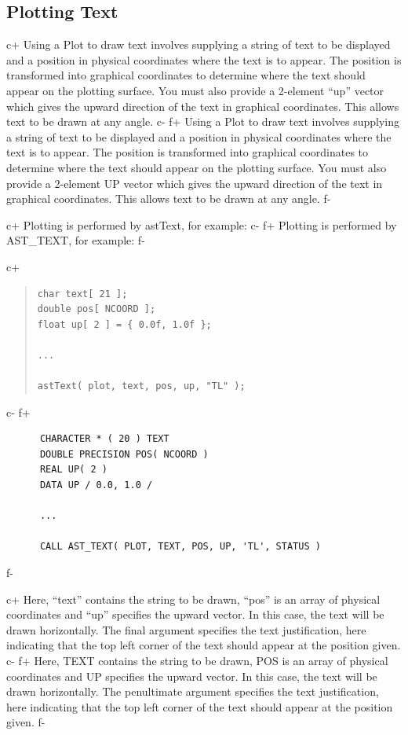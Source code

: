 \documentclass[twoside,11pt]{article}
\begin{document}
\subsection{Plotting Text}

c+
Using a Plot to draw text involves supplying a string of text to be
displayed and a position in physical coordinates where the text is to
appear. The position is transformed into graphical coordinates to
determine where the text should appear on the plotting surface. You
must also provide a 2-element ``up'' vector which gives the upward
direction of the text in graphical coordinates. This allows text to be
drawn at any angle.
c-
f+
Using a Plot to draw text involves supplying a string of text to be
displayed and a position in physical coordinates where the text is to
appear. The position is transformed into graphical coordinates to
determine where the text should appear on the plotting surface. You
must also provide a 2-element UP vector which gives the upward
direction of the text in graphical coordinates. This allows text to be
drawn at any angle.
f-

c+
Plotting is performed by astText, for example:
c-
f+
Plotting is performed by AST\_TEXT, for example:
f-

c+
\begin{quote}
\small
\begin{verbatim}
char text[ 21 ];
double pos[ NCOORD ];
float up[ 2 ] = { 0.0f, 1.0f };

...

astText( plot, text, pos, up, "TL" );
\end{verbatim}
\normalsize
\end{quote}
c-
f+
\small
\begin{verbatim}
      CHARACTER * ( 20 ) TEXT
      DOUBLE PRECISION POS( NCOORD )
      REAL UP( 2 )
      DATA UP / 0.0, 1.0 /

      ...

      CALL AST_TEXT( PLOT, TEXT, POS, UP, 'TL', STATUS )
\end{verbatim}
\normalsize
f-

c+
Here, ``text'' contains the string to be drawn, ``pos'' is an array of
physical coordinates and ``up'' specifies the upward vector. In this
case, the text will be drawn horizontally. The final argument
specifies the text justification, here indicating that the top left
corner of the text should appear at the position given.
c-
f+
Here, TEXT contains the string to be drawn, POS is an array of
physical coordinates and UP specifies the upward vector. In this case,
the text will be drawn horizontally. The penultimate argument
specifies the text justification, here indicating that the top left
corner of the text should appear at the position given.
f-
\end{document}
